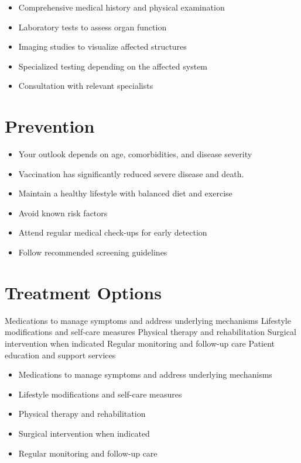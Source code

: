 \begin{itemize}[noitemsep]
  \item Comprehensive medical history and physical examination
  \item Laboratory tests to assess organ function
  \item Imaging studies to visualize affected structures
  \item Specialized testing depending on the affected system
  \item Consultation with relevant specialists
\end{itemize}
\section{Prevention}
\begin{itemize}[noitemsep]
  \item Your outlook depends on age, comorbidities, and disease severity
  \item Vaccination has significantly reduced severe disease and death.
  \item Maintain a healthy lifestyle with balanced diet and exercise
  \item Avoid known risk factors
  \item Attend regular medical check-ups for early detection
  \item Follow recommended screening guidelines
\end{itemize}
\section{Treatment Options}
Medications to manage symptoms and address underlying mechanisms Lifestyle modifications and self-care measures Physical therapy and rehabilitation Surgical intervention when indicated Regular monitoring and follow-up care Patient education and support services

\begin{itemize}[noitemsep]
  \item Medications to manage symptoms and address underlying mechanisms
  \item Lifestyle modifications and self-care measures
  \item Physical therapy and rehabilitation
  \item Surgical intervention when indicated
  \item Regular monitoring and follow-up care
\end{itemize}

